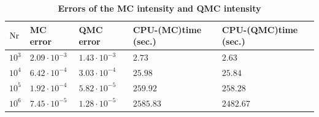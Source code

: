 \begin{table}[h!] \label{tab:table_tir_triangulation}
\centering
\caption{\bf Errors of the MC intensity and QMC intensity}
\begin{tabular}{lllll}
 \hline  $\textrm{Nr}$\;  & MC error & QMC error & CPU-(MC)time (sec.) & CPU-(QMC)time (sec.)\\
  \hline 
 $10^3$ & $2.09\cdot 10^{-3}$  & $1.43\cdot10^{-3}$  & $2.73$  & $2.63$  \\
$10^4$  & $6.42\cdot 10^{-4}$  & $3.03\cdot 10^{-4}$  & $25.98$  & $25.84$   \\
$10^5$  & $1.92\cdot 10^{-4}$  & $5.82\cdot 10^{-5}$  & $259.92$  & $258.28$  \\
 $10^6$  & $7.45\cdot 10^{-5}$  & $1.28\cdot 10^{-5}$  & $2585.83$ & $2482.67$  \\
 \hline
 \end{tabular}
 \label{tab:qmc_error_triangulation}
 \end{table}

